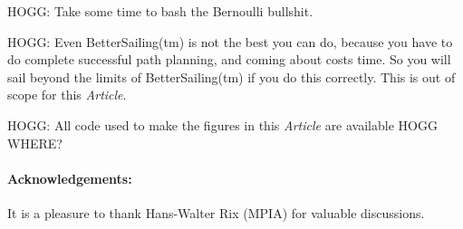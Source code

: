 \documentclass{article}
\newcommand{\documentname}{\textsl{Article}}
\begin{document}
HOGG: Take some time to bash the Bernoulli bullshit.

HOGG: Even BetterSailing(tm) is not the best you can do, because you have to do complete successful path planning, and coming about costs time. So you will sail beyond the limits of BetterSailing(tm) if you do this correctly. This is out of scope for this \documentname.

HOGG: All code used to make the figures in this \documentname{} are available HOGG WHERE?

\paragraph{Acknowledgements:}
It is a pleasure to thank Hans-Walter Rix (MPIA) for valuable discussions.

\raggedright
\printbibliography
\end{document}
